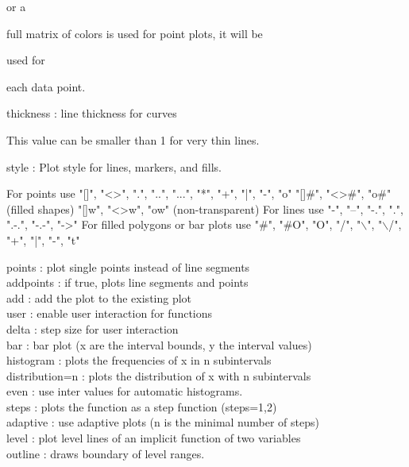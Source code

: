 \documentclass[a4paper,10pt]{article}
\begin{document}
\begin{eulernotebook}
\begin{eulercomment}
or a\\
\end{eulercomment}
\begin{eulerttcomment}
            full matrix of colors is used for point plots, it will be
\end{eulerttcomment}
\begin{eulercomment}
used for\\
\end{eulercomment}
\begin{eulerttcomment}
            each data point.
\end{eulerttcomment}
\begin{eulercomment}
thickness : line thickness for curves\\
\end{eulercomment}
\begin{eulerttcomment}
            This value can be smaller than 1 for very thin lines.
\end{eulerttcomment}
\begin{eulercomment}
style     : Plot style for lines, markers, and fills.\\
\end{eulercomment}
\begin{eulerttcomment}
            For points use
            "[]", "<>", ".", "..", "...",
            "*", "+", "|", "-", "o"
            "[]#", "<>#", "o#" (filled shapes)
            "[]w", "<>w", "ow" (non-transparent)
            For lines use
            "-", "--", "-.", ".", ".-.", "-.-", "->"
            For filled polygons or bar plots use
            "#", "#O", "O", "/", "\(\backslash\)", "\(\backslash\)/",
            "+", "|", "-", "t"
\end{eulerttcomment}
\begin{eulercomment}
points    : plot single points instead of line segments\\
addpoints : if true, plots line segments and points\\
add       : add the plot to the existing plot\\
user      : enable user interaction for functions\\
delta     : step size for user interaction\\
bar       : bar plot (x are the interval bounds, y the interval
values)\\
histogram : plots the frequencies of x in n subintervals\\
distribution=n : plots the distribution of x with n subintervals\\
even      : use inter values for automatic histograms.\\
steps     : plots the function as a step function (steps=1,2)\\
adaptive  : use adaptive plots (n is the minimal number of steps)\\
level     : plot level lines of an implicit function of two variables\\
outline   : draws boundary of level ranges.


\end{eulercomment}
\end{eulernotebook}
\end{document}
